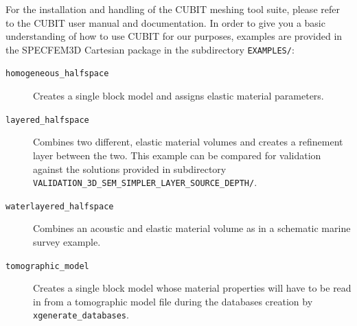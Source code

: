 For the installation and handling of the CUBIT meshing tool suite,
please refer to the CUBIT user manual and documentation. In order
to give you a basic understanding of how to use CUBIT for our purposes,
examples are provided in the SPECFEM3D Cartesian package in the subdirectory
\texttt{EXAMPLES/}:
\begin{description}
\item [{\texttt{homogeneous\_halfspace}}] Creates a single block model
and assigns elastic material parameters.
\item [{\texttt{layered\_halfspace}}] Combines two different, elastic material
volumes and creates a refinement layer between the two. This example
can be compared for validation against the solutions provided in subdirectory
~\\
 \texttt{VALIDATION\_3D\_SEM\_SIMPLER\_LAYER\_SOURCE\_DEPTH/}.
\item [{\texttt{waterlayered\_halfspace}}] Combines an acoustic and elastic
material volume as in a schematic marine survey example.
\item [{\texttt{tomographic\_model}}] Creates a single block model whose
material properties will have to be read in from a tomographic model
file during the databases creation by \texttt{xgenerate\_databases}.
\end{description}
%
